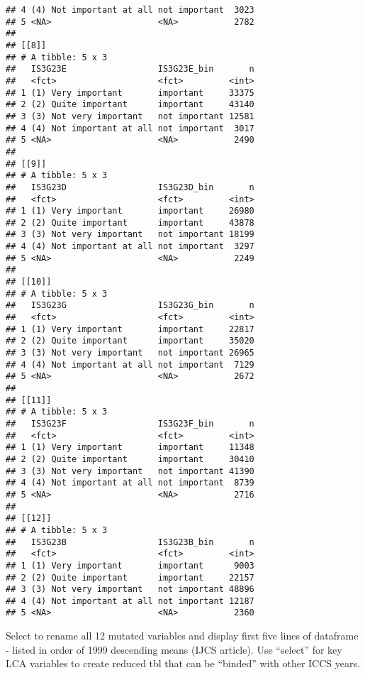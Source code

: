 \documentclass[]{article}
\begin{document}
\begin{verbatim}
## 4 (4) Not important at all not important  3023
## 5 <NA>                     <NA>           2782
## 
## [[8]]
## # A tibble: 5 x 3
##   IS3G23E                  IS3G23E_bin       n
##   <fct>                    <fct>         <int>
## 1 (1) Very important       important     33375
## 2 (2) Quite important      important     43140
## 3 (3) Not very important   not important 12581
## 4 (4) Not important at all not important  3017
## 5 <NA>                     <NA>           2490
## 
## [[9]]
## # A tibble: 5 x 3
##   IS3G23D                  IS3G23D_bin       n
##   <fct>                    <fct>         <int>
## 1 (1) Very important       important     26980
## 2 (2) Quite important      important     43878
## 3 (3) Not very important   not important 18199
## 4 (4) Not important at all not important  3297
## 5 <NA>                     <NA>           2249
## 
## [[10]]
## # A tibble: 5 x 3
##   IS3G23G                  IS3G23G_bin       n
##   <fct>                    <fct>         <int>
## 1 (1) Very important       important     22817
## 2 (2) Quite important      important     35020
## 3 (3) Not very important   not important 26965
## 4 (4) Not important at all not important  7129
## 5 <NA>                     <NA>           2672
## 
## [[11]]
## # A tibble: 5 x 3
##   IS3G23F                  IS3G23F_bin       n
##   <fct>                    <fct>         <int>
## 1 (1) Very important       important     11348
## 2 (2) Quite important      important     30410
## 3 (3) Not very important   not important 41390
## 4 (4) Not important at all not important  8739
## 5 <NA>                     <NA>           2716
## 
## [[12]]
## # A tibble: 5 x 3
##   IS3G23B                  IS3G23B_bin       n
##   <fct>                    <fct>         <int>
## 1 (1) Very important       important      9003
## 2 (2) Quite important      important     22157
## 3 (3) Not very important   not important 48896
## 4 (4) Not important at all not important 12187
## 5 <NA>                     <NA>           2360
\end{verbatim}

Select to rename all 12 mutated variables and display first five lines
of dataframe - listed in order of 1999 descending means (IJCS article).
Use ``select'' for key LCA variables to create reduced tbl that can be
``binded'' with other ICCS years.
\end{document}
